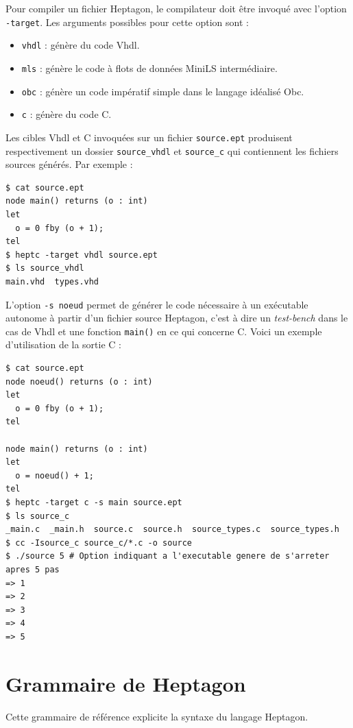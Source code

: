 \documentclass[a4paper]{article}
\newcommand{\LANG}{{\sc Heptagon}}
\newcommand{\minils}{{\sc MiniLS}}
\newcommand{\heptagon}{{\sc Heptagon}}
\newcommand{\vhdl}{{\sc Vhdl}}
\begin{document}
Pour compiler un fichier \LANG, le compilateur doit être invoqué avec l'option
\verb/-target/. Les arguments possibles pour cette option sont :

\begin{itemize}
\item \verb/vhdl/ : génère du code \vhdl{}.
\item \verb/mls/ : génère le code à flots de données \minils{} intermédiaire.
\item \verb/obc/ : génère un code impératif simple dans le langage idéalisé Obc.
\item \verb/c/ : génère du code C.
\end{itemize}

Les cibles \vhdl{} et C invoquées sur un fichier \verb/source.ept/ produisent
respectivement un dossier \verb/source_vhdl/ et \verb/source_c/ qui contiennent
les fichiers sources générés. Par exemple :

\begin{verbatim}
$ cat source.ept
node main() returns (o : int)
let
  o = 0 fby (o + 1);
tel
$ heptc -target vhdl source.ept
$ ls source_vhdl
main.vhd  types.vhd
\end{verbatim}

L'option \verb/-s noeud/ permet de générer le code nécessaire à un
exécutable autonome à partir d'un fichier source \LANG, c'est à dire un
\textit{test-bench} dans le cas de \vhdl{} et une fonction \verb/main()/ en ce
qui concerne C. Voici un exemple d'utilisation de la sortie C :

\begin{verbatim}
$ cat source.ept
node noeud() returns (o : int)
let
  o = 0 fby (o + 1);
tel

node main() returns (o : int)
let
  o = noeud() + 1;
tel
$ heptc -target c -s main source.ept
$ ls source_c
_main.c  _main.h  source.c  source.h  source_types.c  source_types.h
$ cc -Isource_c source_c/*.c -o source
$ ./source 5 # Option indiquant a l'executable genere de s'arreter apres 5 pas
=> 1
=> 2
=> 3
=> 4
=> 5
\end{verbatim}

\section{Grammaire de Heptagon}

Cette grammaire de référence explicite la syntaxe du langage \heptagon.

\newcommand{\sdash}{\mbox{-}}
\newcommand{\spow}{\text{\^{ }}}
\newcommand{\piquots}[1]{<<#1>>}
\end{document}
